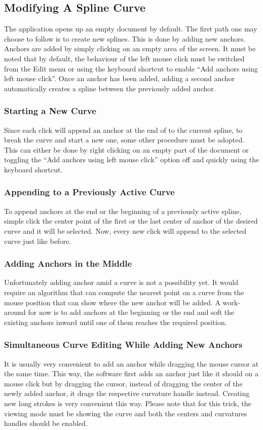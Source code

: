 \subsection{Modifying A Spline Curve}
{
    The application opens up an empty document by default. The first path one may choose to follow is to create new splines. This is done by adding new anchors. Anchors are added by simply clicking on an empty area of the screen. It must be noted that by default, the behaviour of the left mouse click must be switched from the Edit menu or using the keyboard shortcut to enable ``Add anchors using left mouse click''. Once an anchor has been added, adding a second anchor automatically creates a spline between the previously added anchor. 
    \subsubsection{Starting a New Curve}
    {
        Since each click will append an anchor at the end of to the current spline, to break the curve and start a new one, some other procedure must be adopted. This can either be done by right clicking on an empty part of the document or toggling the ``Add anchors using left mouse click'' option off and quickly using the keyboard shortcut.
    }
    \subsubsection{Appending to a Previously Active Curve}
    {
        To append anchors at the end or the beginning of a previously active spline, simple click the center point of the first or the last center of anchor of the desired curve and it will be selected. Now, every new click will append to the selected curve just like before.
    }
    \subsubsection{Adding Anchors in the Middle}
    {
        Unfortunately adding anchor amid a curve is not a possibility yet. It would require an algorithm that can compute the nearest point on a curve from the mouse position that can show where the new anchor will be added. A work-around for now is to add anchors at the beginning or the end and soft the existing anchors inward until one of them reaches the required position.
    }
    \subsubsection{Simultaneous Curve Editing While Adding New Anchors}
    {
        It is usually very convenient to add an anchor while dragging the mouse cursor at the same time. This way, the software first adds an anchor just like it should on a mouse click but by dragging the cursor, instead of dragging the center of the newly added anchor, it drags the respective curvature handle instead. Creating new long strokes is very convenient this way. Please note that for this trick, the viewing mode must be showing the curve and both the centers and curvatures handles should be enabled.
    }
}
